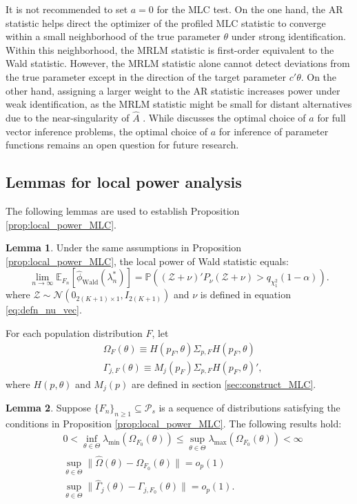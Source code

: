 \documentclass[11pt]{article}
\theoremstyle{definition}
\newtheorem{lemma}{Lemma}[section]
\newcommand{\Exp}{\ensuremath{\mathbb{E}}} %
\newcommand{\Prob}{\ensuremath{\mathbb{P}}} %
\newcommand{\0}{\ensuremath{\mathbf{0}}}
\newcommand{\normal}{\ensuremath{\mathcal{N}}}
\begin{document}
\begin{bibunit}
It is not recommended to set $a = 0$ for the MLC test. On the one hand, the AR statistic helps direct the optimizer of the profiled MLC statistic to converge within a small neighborhood of the true parameter $\theta$ under strong identification. Within this neighborhood, the MRLM statistic is first-order equivalent to the Wald statistic. However, the MRLM statistic alone cannot detect deviations from the true parameter except in the direction of the target parameter $c'\theta$. On the other hand, assigning a larger weight to the AR statistic increases power under weak identification, as the MRLM statistic might be small for distant alternatives due to the near-singularity of $\hat{A}$ \citep{kleibergen:2005}. While \cite{andrews:2016} discusses the optimal choice of $a$ for full vector inference problems, the optimal choice of $a$ for  inference of parameter functions remains an open question for future research.

\subsection{Lemmas for local power analysis}
The following lemmas are used to establish Proposition \ref{prop:local_power_MLC}.

\begin{lemma}
\label{lem:wald_local_power}
    Under the same assumptions in Proposition \ref{prop:local_power_MLC}, the local power of Wald statistic equals:
    \[
        \lim_{n\to\infty} \Exp_{F_n}[\hat{\phi}_{\text{Wald}}(\lambda_n^*)] = \Prob((\mathcal{Z} + \nu)'P_\nu (\mathcal{Z} + \nu) > q_{\chi_1^2}(1-\alpha)).
    \]
    where $\mathcal{Z} \sim \normal(0_{2(K+1)\times 1}, I_{2(K+1)})$ and $\nu$ is defined in equation \eqref{eq:defn_nu_vec}.
\end{lemma}


For each population distribution $F$, let 
\begin{align*}
    & \Omega_{F}(\theta) \equiv H(p_F, \theta) \Sigma_{p,F} H(p_F,\theta) \\ %
    & \Gamma_{j,F}(\theta) \equiv M_j(p_F)\Sigma_{p,F} H(p_F,\theta)', %
\end{align*}
where $H(p,\theta)$ and $M_j(p)$ are defined in section \ref{sec:construct_MLC}.
\begin{lemma}
\label{lem:consistent_cov_strong_id}
    Suppose $\{F_n\}_{n\geq 1} \subseteq \mathcal{P}_s$ is a sequence of distributions satisfying the conditions in Proposition \ref{prop:local_power_MLC}. The following results hold:
    \begin{align}
    & 0 < \inf_{\theta \in\Theta} \lambda_{\min}(\Omega_{F_0}(\theta)) \leq 
    \sup_{\theta \in\Theta}\lambda_{\max}(\Omega_{F_0}(\theta)) < \infty \label{eq:lem_locpower_regular1} \\
    & \sup_{\theta \in\Theta}\|\hat{\Omega}(\theta) - \Omega_{F_0}(\theta)\| = o_p(1) 
    \label{eq:lem_locpower_regular2} \\
    & \sup_{\theta \in\Theta}\|\hat{\Gamma}_j(\theta) - \Gamma_{j,F_0}(\theta)\| = o_p(1).
    \label{eq:lem_locpower_regular3}
    \end{align}
\end{lemma}





\end{bibunit}
\end{document}
